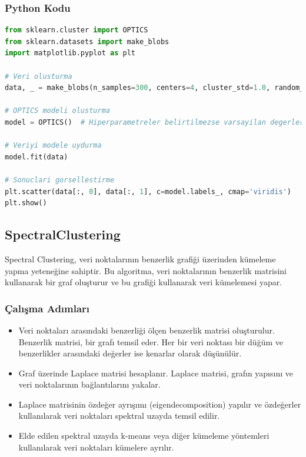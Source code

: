 \subsubsection{Python Kodu}

\begin{lstlisting}[language=Python, caption=Scikit-learn'de OPTICS örneği.]
from sklearn.cluster import OPTICS
from sklearn.datasets import make_blobs
import matplotlib.pyplot as plt

# Veri olusturma
data, _ = make_blobs(n_samples=300, centers=4, cluster_std=1.0, random_state=42)

# OPTICS modeli olusturma
model = OPTICS()  # Hiperparametreler belirtilmezse varsayilan degerler kullanilir.

# Veriyi modele uydurma
model.fit(data)

# Sonuclari gorsellestirme
plt.scatter(data[:, 0], data[:, 1], c=model.labels_, cmap='viridis')
plt.show()
\end{lstlisting}

\newpage

\subsection{SpectralClustering}
Spectral Clustering, veri noktalarının benzerlik grafiği üzerinden kümeleme yapma yeteneğine sahiptir. Bu algoritma, veri noktalarının benzerlik matrisini kullanarak bir graf oluşturur ve bu grafiği kullanarak veri kümelemesi yapar.

\subsubsection{Çalışma Adımları}
\begin{itemize}
    \item Veri noktaları arasındaki benzerliği ölçen benzerlik matrisi oluşturulur. Benzerlik matrisi, bir grafı temsil eder. Her bir veri noktası bir düğüm ve benzerlikler arasındaki değerler ise kenarlar olarak düşünülür.
    \item Graf üzerinde Laplace matrisi hesaplanır. Laplace matrisi, grafın yapısını ve veri noktalarının bağlantılarını yakalar.
    \item Laplace matrisinin özdeğer ayrışımı (eigendecomposition) yapılır ve özdeğerler kullanılarak veri noktaları spektral uzayda temsil edilir.
    \item Elde edilen spektral uzayda k-means veya diğer kümeleme yöntemleri kullanılarak veri noktaları kümelere ayrılır.
\end{itemize}

